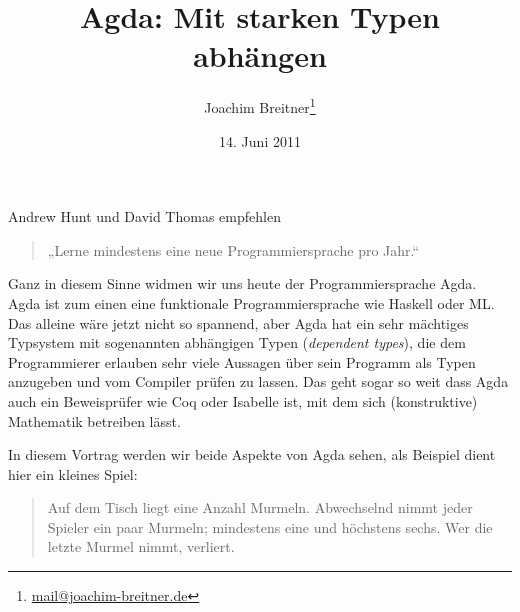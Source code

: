 \documentclass[12pt,parskip=half,headings=normal,abstract]{scrartcl}
\author{Joachim Breitner\footnote{\href{mailto:mail@joachim-breitner.de}{mail@joachim-breitner.de}}}
\title{Agda: Mit starken Typen abhängen}
\date{14. Juni 2011}
\begin{document}
\maketitle

Andrew Hunt und David Thomas empfehlen
\begin{quote}
„Lerne mindestens eine neue Programmiersprache pro Jahr.“
\end{quote}
Ganz in diesem Sinne widmen wir uns heute der Programmiersprache Agda. Agda ist zum einen eine funktionale Programmiersprache wie Haskell oder ML. Das alleine wäre jetzt nicht so spannend, aber Agda hat ein sehr mächtiges Typsystem mit sogenannten abhängigen Typen (\emph{dependent types}), die dem Programmierer erlauben sehr viele Aussagen über sein Programm als Typen anzugeben und vom Compiler prüfen zu lassen. Das geht sogar so weit dass Agda auch ein Beweisprüfer wie Coq oder Isabelle ist, mit dem sich (konstruktive) Mathematik betreiben lässt.

In diesem Vortrag werden wir beide Aspekte von Agda sehen, als Beispiel dient hier ein kleines Spiel:

\begin{quote}
Auf dem Tisch liegt eine Anzahl Murmeln. Abwechselnd nimmt jeder Spieler ein paar Murmeln; mindestens eine und höchstens sechs. Wer die letzte Murmel nimmt, verliert.
\end{quote}





\appendix

\end{document}
